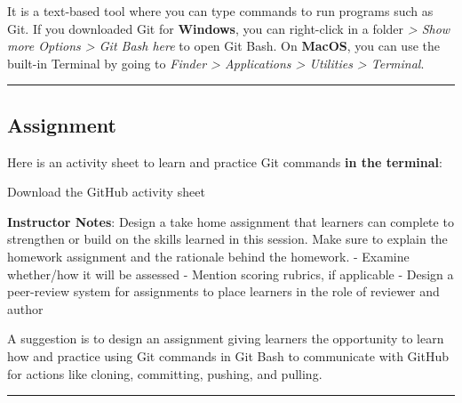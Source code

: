 \documentclass[
  letterpaper,
  DIV=11,
  numbers=noendperiod]{scrartcl}
\begin{document}
\begin{tcolorbox}[enhanced jigsaw, arc=.35mm, bottomrule=.15mm, bottomtitle=1mm, breakable, colback=white, colbacktitle=quarto-callout-tip-color!10!white, colframe=quarto-callout-tip-color-frame, coltitle=black, left=2mm, leftrule=.75mm, opacityback=0, opacitybacktitle=0.6, rightrule=.15mm, title=\textcolor{quarto-callout-tip-color}{\faLightbulb}\hspace{0.5em}{What is a \textbf{terminal}?}, titlerule=0mm, toprule=.15mm, toptitle=1mm]

It is a text-based tool where you can type commands to run programs such
as Git. If you downloaded Git for \textbf{Windows}, you can right-click
in a folder \emph{\textgreater{} Show more Options \textgreater{} Git
Bash here} to open Git Bash. On \textbf{MacOS}, you can use the built-in
Terminal by going to \emph{Finder \textgreater{} Applications
\textgreater{} Utilities \textgreater{} Terminal}.

\end{tcolorbox}

\begin{center}\rule{0.5\linewidth}{0.5pt}\end{center}

\subsection{Assignment}\label{assignment}

Here is an activity sheet to learn and practice Git commands \textbf{in
the terminal}:

Download the GitHub activity sheet

\textbf{Instructor Notes}: Design a take home assignment that learners
can complete to strengthen or build on the skills learned in this
session. Make sure to explain the homework assignment and the rationale
behind the homework. - Examine whether/how it will be assessed - Mention
scoring rubrics, if applicable - Design a peer-review system for
assignments to place learners in the role of reviewer and author

A suggestion is to design an assignment giving learners the opportunity
to learn how and practice using Git commands in Git Bash to communicate
with GitHub for actions like cloning, committing, pushing, and pulling.

\begin{center}\rule{0.5\linewidth}{0.5pt}\end{center}
\end{document}
